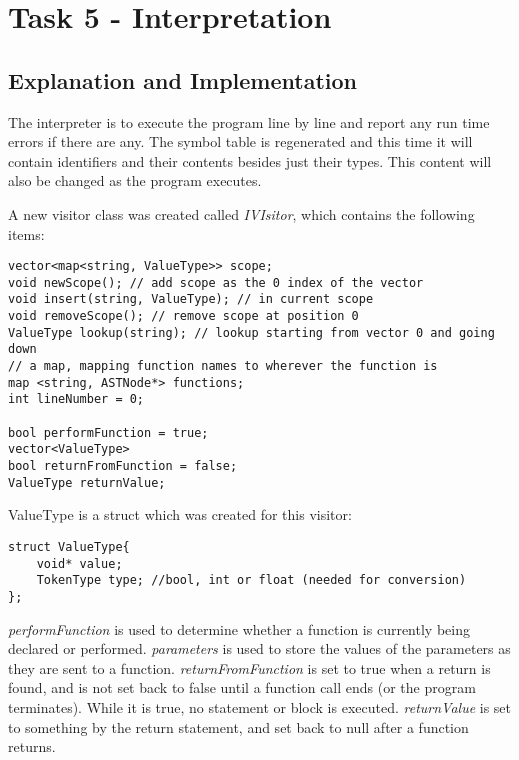 \section{Task 5 - Interpretation}
\subsection{Explanation and Implementation}
The interpreter is to execute the program line by line and report any run time errors if there are any. The symbol table is regenerated and this time it will contain identifiers and their contents besides just their types. This content will also be changed as the program executes.

A new visitor class was created called \textit{IVIsitor}, which contains the following items:

\begin{lstlisting}
vector<map<string, ValueType>> scope;
void newScope(); // add scope as the 0 index of the vector
void insert(string, ValueType); // in current scope
void removeScope(); // remove scope at position 0
ValueType lookup(string); // lookup starting from vector 0 and going down
// a map, mapping function names to wherever the function is
map <string, ASTNode*> functions;
int lineNumber = 0;

bool performFunction = true;
vector<ValueType> 
bool returnFromFunction = false;
ValueType returnValue;
\end{lstlisting}
ValueType is a struct which was created for this visitor:
\begin{lstlisting}
struct ValueType{
	void* value;
	TokenType type; //bool, int or float (needed for conversion)
};
\end{lstlisting}

\textit{performFunction} is used to determine whether a function is currently being declared or performed. \textit{parameters} is used to store the values of the parameters as they are sent to a function. \textit{returnFromFunction} is set to true when a return is found, and is not set back to false until a function call ends (or the program terminates). While it is true, no statement or block is executed. \textit{returnValue} is set to something by the return statement, and set back to null after a function returns.


